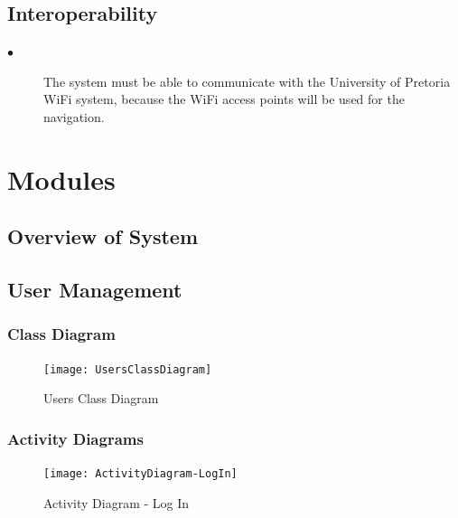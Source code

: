 \documentclass{article}
\begin{document}
    \subsection{Interoperability}

        \begin{description}

        \item[$\bullet$]The system must be able to communicate with the University of Pretoria WiFi system, because the WiFi  access points will be used for the navigation.

        \end{description}
\newpage
\section{Modules}

	\subsection{Overview of System}
	
	\newpage
    \subsection{User Management}
        \subsubsection{Class Diagram}
        		\begin{figure}[H]
  			\caption{Users Class Diagram}
  			\centering
    			\texttt{[image: UsersClassDiagram]}
		\end{figure}
		\newpage
        \subsubsection{Activity Diagrams}
        	\begin{figure}[H]
  			\caption{Activity Diagram - Log In}
  			\centering
    			\texttt{[image: ActivityDiagram-LogIn]}
		\end{figure}
\end{document}
